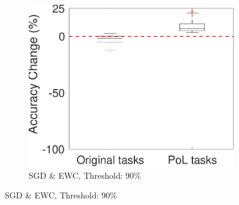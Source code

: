 \begin{figure}[!t]
\begin{subfigure}{.3\textwidth}
        \includegraphics[width=1\textwidth]{../other/figures/90-117-4_v3.pdf}
        \caption{SGD \& EWC, Threshold: $90\%$}
        \label{90_box}
    \end{subfigure}
    

\end{figure}
